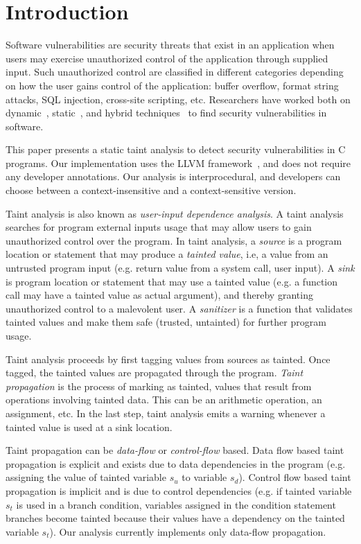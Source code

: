 \section{Introduction}
Software vulnerabilities are security threats
that exist in an application when users may exercise
unauthorized  control of the application through supplied input.
Such unauthorized control are classified in different
categories depending on how the user gains control of
the application: buffer overflow, format string attacks,
SQL injection, cross-site scripting, etc.
Researchers have worked both on dynamic~\cite{Clause:2007:Dytan,
Kiezun:2009:Ardilla}, static~\cite{Tripp:2009:TAJ, Kiezun:2009:Ardilla,
Chang:2009:ICS, Parfait:2008, Jovanovic:2006:Pixy, livshits05finding,
Avots:2005:ISS, Shankar:2001:DFS}, and hybrid
techniques~\cite{Trip:2011:HAJSA} to find  security
vulnerabilities in software. 

This paper presents a static taint analysis to detect
security vulnerabilities in C programs. Our implementation uses
the LLVM framework~\cite{Lattner:2004:LLVM}, and does
not require any developer annotations. Our analysis
is interprocedural, and developers can choose between a
context-insensitive and a context-sensitive version. 

Taint analysis is also known as \textit{user-input dependence analysis}.
A taint analysis searches for program external inputs usage that
may allow users to gain unauthorized control over the program. 
In taint analysis, a \textit{source} is a program location
or statement that may produce a \textit{tainted value}, i.e,
a value from an untrusted program input (e.g. return value from a
system call, user input). 
A \textit{sink} is program location or statement that may use
a tainted value (e.g. a function call may have a tainted value as
actual argument), and thereby granting unauthorized control
to a malevolent user.
A \textit{sanitizer} is a function that validates tainted
values and make them safe (trusted, untainted) for further
program usage.

Taint analysis proceeds by first tagging values from sources
as tainted. Once tagged, the tainted values are propagated
through the program.
\textit{Taint propagation} is the process of marking as tainted, 
values that result from operations involving tainted data. This
can be an arithmetic operation, an assignment, etc. In the
last step, taint analysis emits a warning whenever a tainted
value is used at a sink location.

Taint propagation can be \textit{data-flow} or \textit{control-flow}
based. Data flow based taint propagation is explicit and exists
due to data dependencies in the program (e.g. assigning the value
of tainted variable $s_u$ to variable $s_d$).
Control flow based taint propagation is implicit and is due to
control dependencies (e.g. if tainted variable $s_t$ is used in a branch
condition, variables assigned in the condition statement branches
become tainted because their values have a dependency on the
tainted variable $s_t$).
Our analysis currently implements only data-flow propagation.

